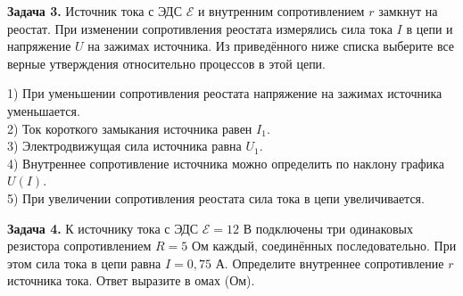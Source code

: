 \begin{taskbasic}[code={\label{task:elem_circ_v5_n14}}]
\textbf{Задача 3.} Источник тока с ЭДС $\mathcal{E}$ и внутренним сопротивлением $r$ замкнут на реостат. При изменении сопротивления реостата измерялись сила тока $I$ в цепи и напряжение $U$ на зажимах источника. Из приведённого ниже списка выберите все верные утверждения относительно процессов в этой цепи.

\nopagebreak\smallskip
\begin{center}
\end{center}

1) При уменьшении сопротивления реостата напряжение на зажимах источника уменьшается.\\
2) Ток короткого замыкания источника равен $I_1$.\\
3) Электродвижущая сила источника равна $U_1$.\\
4) Внутреннее сопротивление источника можно определить по наклону графика $U(I)$.\\
5) При увеличении сопротивления реостата сила тока в цепи увеличивается.

\end{taskbasic}

\begin{taskbasic}[code={\label{task:elem_circ_v6_n25}}]
\textbf{Задача 4.} К источнику тока с ЭДС $\mathcal{E} = 12\text{ В}$ подключены три одинаковых резистора сопротивлением $R = 5\text{ Ом}$ каждый, соединённых последовательно. При этом сила тока в цепи равна $I = 0{,}75\text{ А}$. Определите внутреннее сопротивление $r$ источника тока. Ответ выразите в омах (Ом).

\end{taskbasic}

